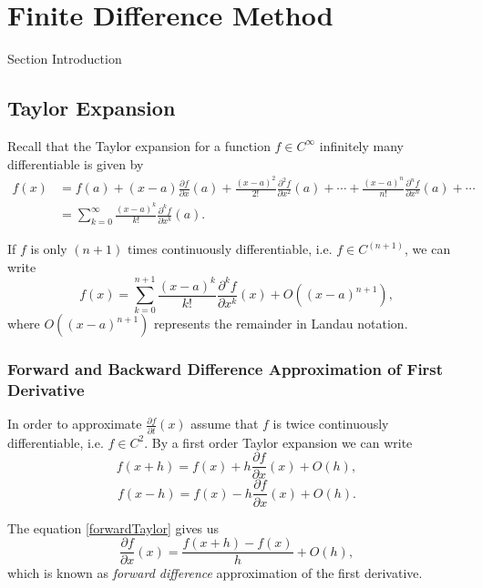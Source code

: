 \chapter{Finite Difference Method}
\label{sec:FD}


Section Introduction

\section{Taylor Expansion}
\label{sec:FD:Taylor}
Recall that the Taylor expansion for a function $f\in C^\infty$ infinitely many differentiable is given by
\begin{align*}
f(x) &= f(a) + (x-a)\frac{\partial f}{\partial x}(a) + \frac{(x-a)^2}{2!}\frac{\partial^2 f}{\partial x^2}(a) + \cdots + \frac{(x-a)^n}{n!}\frac{\partial^n f}{\partial x^n}(a)+\cdots\\
&=\sum_{k = 0}^\infty \frac{(x-a)^k}{k!}\frac{\partial^k f}{\partial x^k}(a).
\end{align*}

If $f$ is only $(n+1)$ times continuously differentiable, i.e. $f\in C^{(n+1)}$, we can write
$$f(x)=\sum_{k = 0}^{n+1} \frac{(x-a)^k}{k!}\frac{\partial^k f}{\partial x^k}(x)+O((x-a)^{n+1}),$$
where $O((x-a)^{n+1})$ represents the remainder in Landau notation.

\subsection{Forward and Backward Difference Approximation of First Derivative}
In order to approximate $\frac{\partial f}{\partial t}(x)$ assume that $f$ is twice continuously differentiable, i.e. $f\in C^2$.  By a first order Taylor expansion we can write
\begin{equation}\label{forwardTaylor}
f(x + h) =  f(x) + h \frac{\partial f}{\partial x}(x)+ O(h),
\end{equation}
\begin{equation}\label{backwardTaylor}
f(x - h) =  f(x) -h \frac{\partial f}{\partial x}(x)+ O(h).
\end{equation}

The equation \eqref{forwardTaylor} gives us
\begin{equation}\label{fwd}
\frac{\partial f}{\partial x}(x) =  \frac{f(x+h)-f(x)}{h} + O(h),
\end{equation}
which is known as \textit{forward difference} approximation of the first derivative. 

